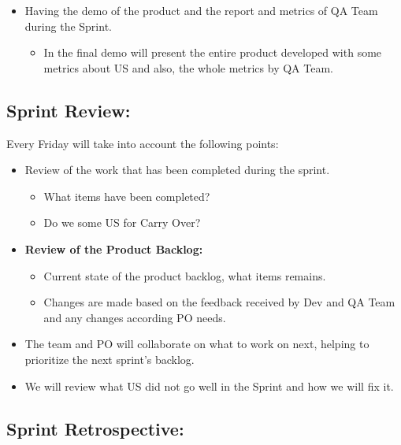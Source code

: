 \documentclass{article}
\providecommand{\tightlist}{
  \setlength{\itemsep}{0pt}\setlength{\parskip}{0pt}}
\begin{document}
\begin{itemize}
\tightlist
\item
  Having the demo of the product and the report and metrics of QA Team
  during the Sprint.

  \begin{itemize}
  \tightlist
  \item
    In the final demo will present the entire product developed with
    some metrics about US and also, the whole metrics by QA Team.
  \end{itemize}
\end{itemize}

\hypertarget{sprintreview}{
\subsection{Sprint Review:}\label{sprintreview}}

Every Friday will take into account the following points:

\begin{itemize}
\tightlist
\item
  Review of the work that has been completed during the sprint.

  \begin{itemize}
  \tightlist
  \item
    What items have been completed?
  \item
    Do we some US for Carry Over?
  \end{itemize}
\item
  \textbf{Review of the Product Backlog:}

  \begin{itemize}
  \tightlist
  \item
    Current state of the product backlog, what items remains.
  \item
    Changes are made based on the feedback received by Dev and QA Team
    and any changes according PO needs.
  \end{itemize}
\item
  The team and PO will collaborate on what to work on next, helping to
  prioritize the next sprint's backlog.
\item
  We will review what US did not go well in the Sprint and how we will
  fix it.
\end{itemize}

\hypertarget{sprintretrospective}{
\subsection{Sprint Retrospective:}\label{sprintretrospective}}
\end{document}
